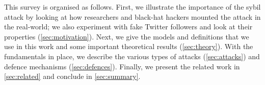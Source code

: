 This survey is organised as follows. First, we illustrate the importance of the
sybil attack by looking at how researchers and black-hat hackers mounted the
attack in the real-world; we also experiment with fake Twitter followers and
look at their properties (\autoref{sec:motivation}). Next, we give the models
and definitions that we use in this work and some important theoretical results
(\autoref{sec:theory}). With the fundamentals in place, we describe the various
types of attacks (\autoref{sec:attacks}) and defence mechanisms
(\autoref{sec:defences}).
Finally, we present the related work in \autoref{sec:related} and conclude in
\autoref{sec:summary}.

